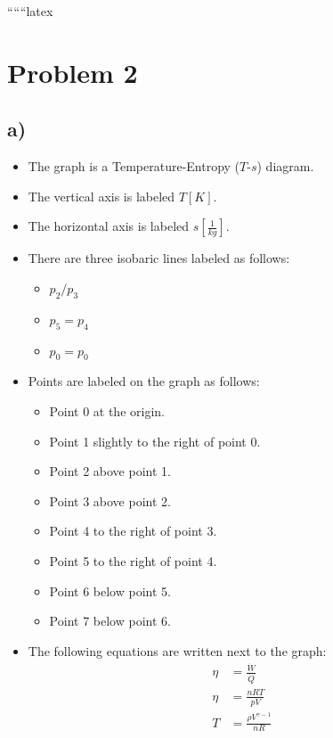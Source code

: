 
``````latex


\section*{Problem 2}

\subsection*{a)}

\begin{itemize}
    \item The graph is a Temperature-Entropy ($T$-$s$) diagram.
    \item The vertical axis is labeled $T [K]$.
    \item The horizontal axis is labeled $s \left[ \frac{1}{kg} \right]$.
    \item There are three isobaric lines labeled as follows:
        \begin{itemize}
            \item $p_2/p_3$
            \item $p_5 = p_4$
            \item $p_0 = p_0$
        \end{itemize}
    \item Points are labeled on the graph as follows:
        \begin{itemize}
            \item Point 0 at the origin.
            \item Point 1 slightly to the right of point 0.
            \item Point 2 above point 1.
            \item Point 3 above point 2.
            \item Point 4 to the right of point 3.
            \item Point 5 to the right of point 4.
            \item Point 6 below point 5.
            \item Point 7 below point 6.
        \end{itemize}
    \item The following equations are written next to the graph:
        \begin{align*}
            \eta &= \frac{\dot{W}}{\dot{Q}} \\
            \eta &= \frac{nRT}{pV} \\
            T &= \frac{\rho V^{\gamma-1}}{nR}
        \end{align*}
\end{itemize}

